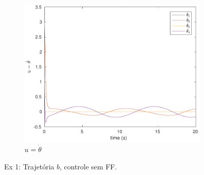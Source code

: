 \documentclass[a4paper,11pt]{article}
\theoremstyle{mytheor}
\begin{document}
\begin{figure}[!ht]
\begin{minipage}{\linewidth}
\begin{subfigure}[b]{0.45\textwidth}
    \end{subfigure}
    \begin{subfigure}[b]{0.45\textwidth}
    \includegraphics[width=1\textwidth]{figs/ex1_b_2_dq.pdf}
    \caption{$u = \dot{\theta}$}
    \label{fig:ex1_b_2_dq}
    \end{subfigure}
  \end{minipage}
\caption{Ex 1: Trajetória $b$, controle sem FF.}
\label{fig:ex1_b_2}
\end{figure}
\end{document}
